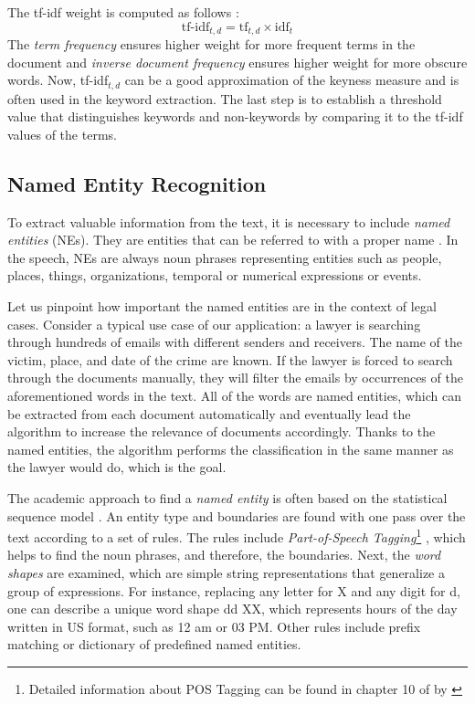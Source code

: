 \documentclass[
  digital, %
  notable,   %
  nolof,     %
  nolot,     %
]{fithesis3}
\begin{document}
The tf-idf weight is computed as follows \cite[ch. 6]{manning2008introduction}:
$$
\text{tf-idf}_{t, d} = \text{tf}_{t,d} \times \text{idf}_t
$$
The \textit{term frequency} ensures higher weight for more frequent terms in the document and \textit{inverse document frequency} ensures higher weight for more obscure words. Now, tf-idf$_{t, d}$ can be a good approximation of the keyness measure and is often used in the keyword extraction. The last step is to establish a threshold value that distinguishes keywords and non-keywords by comparing it to the tf-idf values of the terms.

\subsection{Named Entity Recognition}
\label{sec:named_entities}
To extract valuable information from the text, it is necessary to include \textit{named entities} (NEs).
They are entities that can be referred to with a proper name \cite[ch. 21]{jurafsky2014speech}.
In the speech, NEs are always noun phrases representing entities such as people, places, things, organizations, temporal or numerical expressions or events.

Let us pinpoint how important the named entities are in the context of legal cases.
Consider a typical use case of our application: a lawyer is searching through hundreds of emails with different senders and receivers.
The name of the victim, place, and date of the crime are known.
If the lawyer is forced to search through the documents manually, they will filter the emails by occurrences of the aforementioned words in the text.
All of the words are named entities, which can be extracted from each document automatically and eventually lead the algorithm to increase the relevance of documents accordingly.
Thanks to the named entities, the algorithm performs the classification in the same manner as the lawyer would do, which is the goal.

The academic approach to find a \textit{named entity} is often based on the statistical sequence model \cite[ch. 21]{jurafsky2014speech}.
An entity type and boundaries are found with one pass over the text according to a set of rules.
The rules include \textit{Part-of-Speech Tagging}\footnote{Detailed information about POS Tagging can be found in chapter 10 of  by \citeauthor{jurafsky2014speech} \cite{jurafsky2014speech}}
, which helps to find the noun phrases, and therefore, the boundaries.
Next, the \textit{word shapes} are examined, which are simple string representations that generalize a group of expressions.
For instance, replacing any letter for X and any digit for d, one can describe a unique word shape dd XX, which represents hours of the day written in US format, such as 12 am or 03 PM. 
Other rules include prefix matching or dictionary of predefined named entities.
\end{document}
